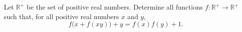 Let $\mathbb{R}^{+}$ be the set of positive real numbers. Determine all functions $f \colon \mathbb{R}^{+} \to \mathbb{R}^{+}$ such that, for all positive real numbers $x$ and $y$,
\[
f\bigl(x + f(xy)\bigr) + y = f(x)f(y) + 1.
\]
